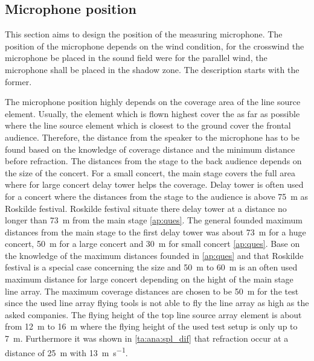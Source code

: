 \subsection{Microphone position}
This section aims to design the position of the measuring microphone. The position of the microphone depends on the wind condition, for the crosswind the microphone be placed in the sound field were for the parallel wind, the microphone shall be placed in the shadow zone. The description starts with the former.


The microphone position highly depends on the coverage area of the line source element. Usually, the element which is flown highest cover the as far as possible where the line source element which is closest to the ground cover the frontal audience. Therefore, the distance from the speaker to the microphone has to be found based on the knowledge of coverage distance and the minimum distance before refraction. The distances from the stage to the back audience depends on the size of the concert. For a small concert, the main stage covers the full area where for large concert delay tower helps the coverage. Delay tower is often used for a concert where the distances from the stage to the audience is above \SI{75}{\meter} as Roskilde festival. Roskilde festival situate there delay tower at a distance no longer than \SI{73}{\meter} from the main stage \autoref{ap:ques}. The general founded maximum distances from the main stage to the first delay tower was about \SI{73}{\meter} for a huge concert, \SI{50}{\meter} for a large concert and \SI{30}{\meter} for small concert \autoref{ap:ques}. Base on the knowledge of the maximum distances founded in \autoref{ap:ques} and that Roskilde festival is a special case concerning the size and \SI{50}{\meter} to \SI{60}{\meter} is an often used maximum distance for large concert depending on the hight of the main stage line array. The maximum coverage distances are chosen to be \SI{50}{\meter} for the test since the used line array flying tools is not able to fly the line array as high as the asked companies. The flying height of the top line source array element is about from \SI{12}{\meter} to \SI{16}{\meter} where the flying height of the used test setup is only up to \SI{7}{\meter}.  Furthermore it was shown in \autoref{ta:ana:spl_dif} that refraction occur at a distance of \SI{25}{\meter} with \SI{13}{\meter\per\second}.

